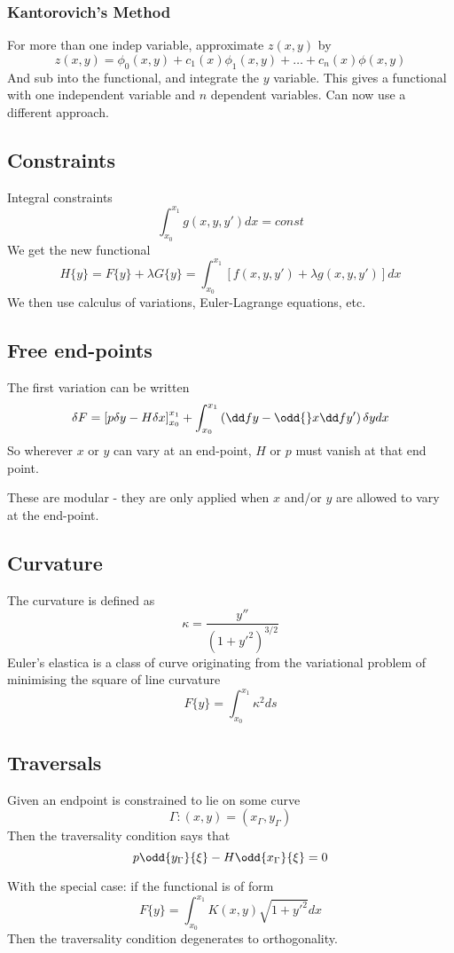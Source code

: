 \documentclass{E:/Documents/Latex/myassignment}
\begin{document}
\subsubsection{Kantorovich's Method}
For more than one indep variable, approximate $z(x,y)$ by
\[z(x,y) = \phi_0(x,y) + c_1(x) \phi_1(x,y) + \ldots + c_n(x) \phi(x,y)\]
And sub into the functional, and integrate the $y$ variable. This gives a functional with one independent variable and $n$ dependent variables. Can now use a different approach.


\subsection{Constraints}
Integral constraints
\[\int_{x_0}^{x_1} g(x,y,y') dx = const\]
We get the new functional
\[H\{y\} = F\{y\} + \lambda G\{y\} = \int_{x_0}^{x_1} \left[f(x,y,y') + \lambda g(x,y,y')\right] dx\]
We then use calculus of variations, Euler-Lagrange equations, etc.


\subsection{Free end-points}
The first variation can be written
\[\delta F = \left[p \delta y - H \delta x\right]_{x_0}^{x_1} + \int_{x_0}^{x_1} \left(\dd f y - \odd{}x \dd f{y'}\right) \delta y dx\]
So wherever $x$ or $y$ can vary at an end-point, $H$ or $p$ must vanish at that end point.

These are modular - they are only applied when $x$ and/or $y$ are allowed to vary at the end-point.


\subsection{Curvature}
The curvature is defined as
\[\kappa = \frac{y''}{(1 + y'^2)^{3/2}}\]
Euler's elastica is a class of curve originating from the variational problem of minimising the square of line curvature
\[F\{y\} = \int_{x_0}^{x_1} \kappa^2 ds\]

\subsection{Traversals}
Given an endpoint is constrained to lie on some curve
\[\Gamma : (x,y) = (x_\Gamma, y_\Gamma)\]
Then the traversality condition says that
\[p \odd{y_\Gamma}{\xi} - H \odd{x_\Gamma}{\xi} = 0\]

With the special case: if the functional is of form
\[F\{y\} = \int_{x_0}^{x_1} K(x,y) \sqrt{1+y'^2} dx\]
Then the traversality condition degenerates to orthogonality.
\end{document}
